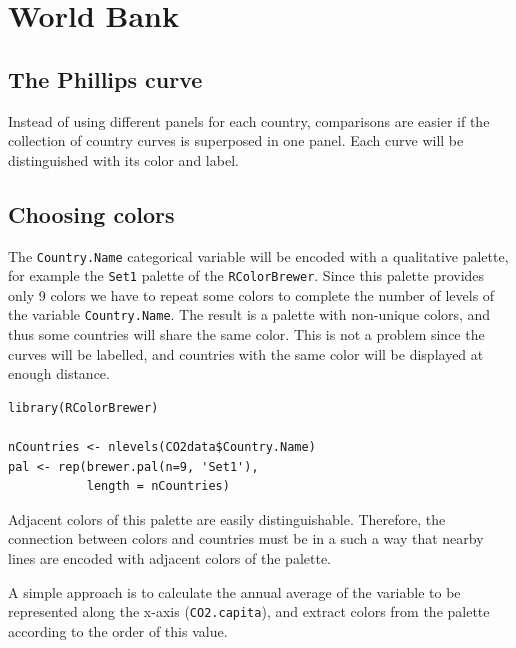 
\section{World Bank}
\label{sec-1}







    
  
  
\subsection{The Phillips curve}
\label{sec-1-1}



Instead of using different panels for each country, comparisons
are easier if the collection of country curves is superposed in
one panel. Each curve will be distinguished with its color and
label.
\subsection{Choosing colors}
\label{sec-1-2}


The \texttt{Country.Name} categorical variable will be encoded with a
qualitative palette, for example the \texttt{Set1} palette of the
\texttt{RColorBrewer}. Since this palette provides only 9 colors we have
to repeat some colors to complete the number of levels of the
variable \texttt{Country.Name}. The result is a palette with non-unique
colors, and thus some countries will share the same color. This is
not a problem since the curves will be labelled, and countries with
the same color will be displayed at enough distance.

\lstset{language=R}
\begin{lstlisting}
library(RColorBrewer)

nCountries <- nlevels(CO2data$Country.Name)
pal <- rep(brewer.pal(n=9, 'Set1'),
           length = nCountries)
\end{lstlisting}

Adjacent colors of this palette are easily
distinguishable. Therefore, the connection between colors and
countries must be in a such a way that nearby lines are encoded
with adjacent colors of the palette. 

A simple approach is to calculate the annual average of the
variable to be represented along the x-axis (\texttt{CO2.capita}), and
extract colors from the palette according to the order of this
value.  

